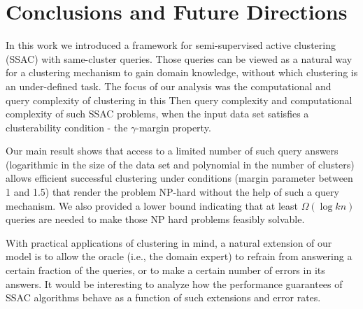 \documentclass{article}
\begin{document}
\section{Conclusions and Future Directions}
In this work we introduced a framework for semi-supervised active clustering (SSAC) with same-cluster queries. Those queries can be viewed as a natural way for a clustering mechanism to gain domain knowledge, without which clustering is an under-defined task. The focus of our analysis was the computational and query complexity of clustering in this  Then query complexity and computational complexity of such SSAC problems, when the input data set satisfies a clusterability condition - the $\gamma$-margin property.

Our main result shows that access to a limited number of such query answers (logarithmic in the size of the data set and polynomial in the number of clusters) allows efficient successful clustering under conditions (margin parameter between 1 and 1.5) that render the problem NP-hard without the help of such a query mechanism.  
 We also provided a lower bound indicating that at least $\Omega(\log kn)$ queries are needed to make those NP hard problems feasibly solvable.

With practical applications of clustering in mind, a natural extension of our model is to allow the oracle (i.e., the domain expert) to refrain from answering a certain fraction of the queries, or to make a certain number of errors in its answers. It would be interesting to analyze how the performance guarantees of SSAC algorithms behave as a function of such extensions and error rates.



\end{document}
